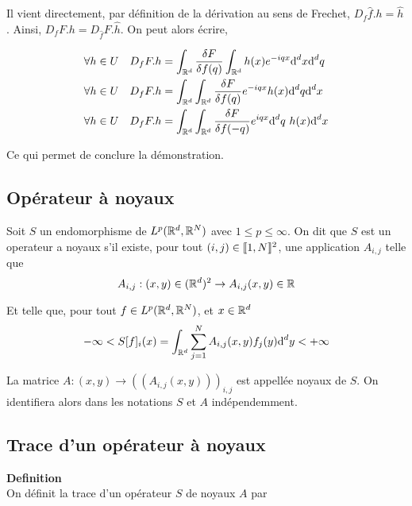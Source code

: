 \documentclass[10pt]{article}
\begin{document}
\begin{multicols}{2}
Il vient directement, par définition de la dérivation au sens de Frechet, $D_f\hat{f} .h = \hat{h}$.  
Ainsi,  $D_f F .h = D_{\hat{f}}F.\hat{h}$.  On peut alors écrire, 

\begin{align}
  \forall h \in U  \quad D_f F .h & = \int_{\mathbb{R}^d} \frac{\delta F}{\delta f(q)} \int_{\mathbb{R}^d} h(x) e^{-iqx} \text{d}^d x \text{d}^d q \\
  \forall h \in U  \quad D_f F .h & = \int_{\mathbb{R}^d} \int_{\mathbb{R}^d} \frac{\delta F}{\delta f(q)} e^{-iqx} h(x) \text{d}^d q \text{d}^d x \\
  \forall h \in U  \quad D_f F .h & = \int_{\mathbb{R}^d} \int_{\mathbb{R}^d} \frac{\delta F}{\delta f(-q)} e^{iqx} \text{d}^d q \text{ } h(x) \text{d}^d x
\end{align}

Ce qui permet de conclure la démonstration.

\vspace*{11pt}


\subsection{Opérateur à noyaux}

Soit $S$ un endomorphisme de $L^p(\mathbb{R}^d, \mathbb{R}^N)$ avec $1 \le p \le \infty$. On dit que $S$ est un operateur a noyaux s'il existe, pour tout $(i,j) \in  \llbracket 1,N \rrbracket ^2$, une application $A_{i,j}$ telle que 
\begin{equation}
A_{i,j} : (x,y) \in (\mathbb{R}^d)^2 \rightarrow A_{i,j}(x,y) \in \mathbb{R}
\end{equation}

Et telle que,  pour tout $f \in L^p(\mathbb{R}^d, \mathbb{R}^N)$, et $x \in \mathbb{R}^d$ 
\begin{equation}
 - \infty < S[f]_i (x) = \int_{\mathbb{R}^d} \sum_{j=1}^{N} A_{i,j}(x,y)f_j(y) \text{d}^d y < +  \infty
\end{equation}

La matrice $A : (x,y) \rightarrow ((A_{i,j}(x,y)))_{i,j}$ est appellée noyaux de $S$. On identifiera alors dans les notations $S$ et $A$ indépendemment.


\vspace*{11pt}

\subsection{Trace d'un opérateur à noyaux}

\textbf{Definition}\\
On définit la trace d'un opérateur $S$ de noyaux $A$ par


\end{multicols}
\end{document}

